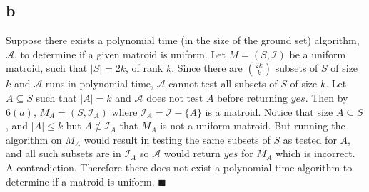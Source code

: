 \documentclass[letterpaper,12pt,oneside,onecolumn]{report}
\begin{document}
\subsection*{b}
Suppose there exists a polynomial time (in the size of the ground set) algorithm, $\mathcal{A}$, to determine if a given matroid is uniform. Let $M = (S,\mathcal{I})$ be a uniform matroid, such that $|S| = 2k$, of rank $k$. Since there are $2k \choose k$ subsets of $S$ of size $k$ and $\mathcal{A}$ runs in polynomial time, $\mathcal{A}$ cannot test all subsets of $S$ of size $k$. Let $A \subseteq S$ such that $|A| = k$ and $\mathcal{A}$ does not test $A$ before returning $yes$. Then by $6(a)$, $M_A = (S, \mathcal{I}_A)$ where $\mathcal{I}_A = \mathcal{I} - \{A\}$ is a matroid. Notice that size $A \subseteq S$, and $|A| \leq k$ but $A \not\in \mathcal{I}_A$ that $M_A$ is not a uniform matroid. But running the algorithm on $M_A$ would result in testing the same subsets of $S$ as tested for $A$, and all such subsets are in $\mathcal{I}_A$ so $\mathcal{A}$ would return $yes$ for $M_A$ which is incorrect. A contradiction. Therefore there does not exist a polynomial time algorithm to determine if a matroid is uniform. $\blacksquare$
\end{document}
